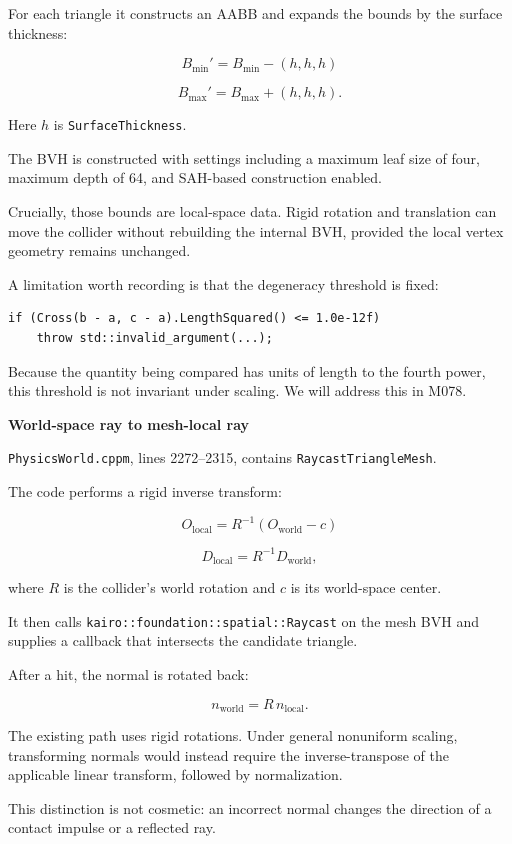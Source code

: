 For each triangle it constructs an AABB and expands the bounds by the surface thickness:

\[
B_{\min}'=B_{\min}-(h,h,h)
\]

\[
B_{\max}'=B_{\max}+(h,h,h).
\]

Here \(h\) is \texttt{SurfaceThickness}.

The BVH is constructed with settings including a maximum leaf size of four, maximum depth of 64, and SAH-based construction enabled.

Crucially, those bounds are local-space data. Rigid rotation and translation can move the collider without rebuilding the internal BVH, provided the local vertex geometry remains unchanged.

A limitation worth recording is that the degeneracy threshold is fixed:

\begin{verbatim}
if (Cross(b - a, c - a).LengthSquared() <= 1.0e-12f)
    throw std::invalid_argument(...);
\end{verbatim}

Because the quantity being compared has units of length to the fourth power, this threshold is not invariant under scaling. We will address this in M078.

\textbf{World-space ray to mesh-local ray}

\texttt{PhysicsWorld.cppm}, lines 2272--2315, contains \texttt{RaycastTriangleMesh}.

The code performs a rigid inverse transform:

\[
O_{\text{local}}=R^{-1}(O_{\text{world}}-c)
\]

\[
D_{\text{local}}=R^{-1}D_{\text{world}},
\]

where \(R\) is the collider's world rotation and \(c\) is its world-space center.

It then calls \texttt{kairo::foundation::spatial::Raycast} on the mesh BVH and supplies a callback that intersects the candidate triangle.

After a hit, the normal is rotated back:

\[
n_{\text{world}}=R\,n_{\text{local}}.
\]

The existing path uses rigid rotations. Under general nonuniform scaling, transforming normals would instead require the inverse-transpose of the applicable linear transform, followed by normalization.

This distinction is not cosmetic: an incorrect normal changes the direction of a contact impulse or a reflected ray.

